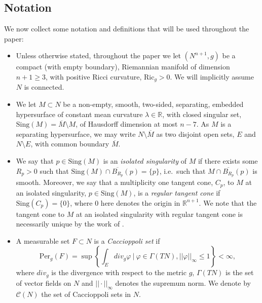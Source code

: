 \documentclass[11pt]{article}
\begin{document}
\subsection{Notation}\label{subsec: notation}

We now collect some notation and definitions that will be used throughout the paper:

\begin{itemize}
    \item Unless otherwise stated, throughout the paper we let $(N^{n+1},g)$ be a compact (with empty boundary), Riemannian manifold of dimension $n+1  \geq 3$, with positive Ricci curvature, $\mathrm{Ric}_g > 0$. We will implicitly assume $N$ is connected.
    
    \item We let $M \subset N$ be a non-empty, smooth, two-sided, separating, embedded hypersurface of constant mean curvature $\lambda \in \mathbb{R}$, with closed singular set, $\mathrm{Sing}(M) = \overline{M} \setminus M$, of Hausdorff dimension at most $n-7$. As $M$ is a separating hypersurface, we may write $N \setminus \overline{M}$ as two disjoint open sets, $E$ and $ N \setminus E$, with common boundary $\overline{M}$.

    \item We say that $p \in \mathrm{Sing}(M)$ is an \textit{isolated singularity} of $M$ if there exists some $R_p > 0$ such that  $\mathrm{Sing}(M) \cap \overline{B_{R_p}}(p) = \{p\}$, i.e.~such that $M \cap \overline{B_{R_p}}(p)$ is smooth. Moreover, we say that a multiplicity one tangent cone, $C_p$, to $M$ at an isolated singularity, $p \in \mathrm{Sing}(M)$, is a \textit{regular tangent cone} if $\mathrm{Sing}(C_p) = \{0\}$, where $0$ here denotes the origin in $\mathbb{R}^{n+1}$. We note that the tangent cone to $M$ at an isolated singularity with regular tangent cone is necessarily unique by the work of \cite{simon}.

    \item A measurable set $F \subset N$ is a \textit{Caccioppoli set} if
    \begin{equation*}
    \mathrm{Per}_g(F) = \sup \left\{\int_E div_g \varphi \: \bigg| \: \varphi \in \Gamma(TN), ||\varphi||_\infty \leq 1 \right\} < \infty,
    \end{equation*}
    where $div_g$ is the divergence with respect to the metric $g$, $\Gamma(TN)$ is the set of vector fields on $N$ and $||\cdot ||_\infty$ denotes the supremum norm. We denote by $\mathcal{C}(N)$ the set of Caccioppoli sets in $N$. 
    

\end{itemize}
\end{document}
